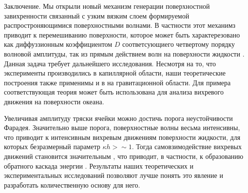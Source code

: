 Заключение. Мы открыли новый механизм генерации поверхностной завихренности связанный с узким вязким слоем формируемой распростроняющимися поверхностными волнами. В частности этот механимз приводит к перемешиванию поверхности, которое может быть характерезовано как диффуззионным коэффициентом $D$ соответсующиего четвертому порядку волновой амплитуды, так из прямым действием волн на поверхности жидкости \cite{Falkovich, Buhler}. Данная задача требует дальнейшего исследования. Несмотря на то, что эксперименты производились в капиллярной области, наши теоретические построения также применимы и в на гравитационной области. Для примера соответствующая теория может быть использована для анализа вихревого движения на поверхности океана.

Увеличивая амплитуду тряски ячейки можно достичь порога неустойчивости Фарадея. Значительно выше порога, поверхностные волны весьма интенсивны, что приводит к интенсивным вихревым движениям поверхности жидкости, для которых безразмерный параметр $\kappa h > \sim 1$. Тогда самовзимодействие вихревых движений становится значительным \cite{Punzmann}, что приводит, в частности, к образованию обратного каскада энергии \cite{Shats_inverse}. Результаты наших теоретических и экспериментальных исследований позволяют лучше понять это явление и разработать количественную основу для него.

\clearpage